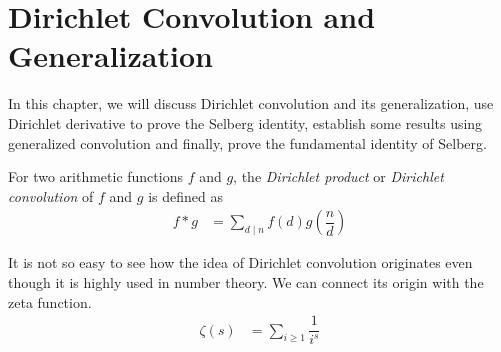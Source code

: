 \documentclass[elemannt.tex]{subfile}
\begin{document}
    \chapter{Dirichlet Convolution and Generalization}
    In this chapter, we will discuss Dirichlet convolution and its generalization, use Dirichlet derivative to prove the Selberg identity, establish some results using generalized convolution and finally, prove the fundamental identity of Selberg.
        \begin{definition}
            For two arithmetic functions $f$ and $g$, the \textit{Dirichlet product} or \textit{Dirichlet convolution} of $f$ and $g$ is defined as
                \begin{align*}
                    f\ast g
                        & = \sum_{d\mid n}f(d)g\left(\dfrac{n}{d}\right)
                \end{align*}
        \end{definition}
    It is not so easy to see how the idea of Dirichlet convolution originates even though it is highly used in number theory. We can connect its origin with the zeta function.
        \begin{align*}
            \zeta(s)
                & = \sum_{i\geq 1}\dfrac{1}{i^{s}}
        \end{align*}
    
\end{document}
